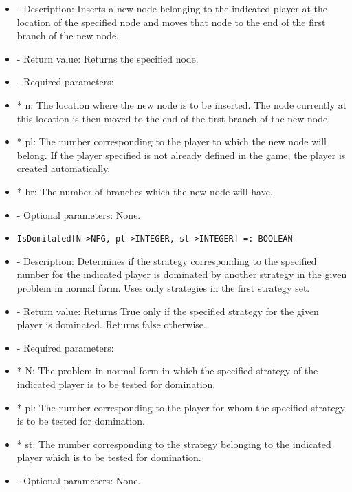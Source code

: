 \begin{itemize}
\bd
\item
- Description:  Inserts a new node belonging to the indicated player at 
the location of the specified node and moves that node to the end of 
the first branch of the new node.
\item
- Return value:  Returns the specified node.
\item
- Required parameters:

\bd
\item
*  n:  The location where the new node is to be inserted.  The node
currently at this location is then moved to the end of the first
branch of the new node.
\item
*  pl:  The number corresponding to the player to which the new node
will belong.  If the player specified is not already defined in	the
game, the player is created automatically.
\item
*  br:  The number of branches which the new node will have.
\ed

\item
- Optional parameters:  None.
\ed

\item
\begin{verbatim}
IsDomitated[N->NFG, pl->INTEGER, st->INTEGER] =: BOOLEAN
\end{verbatim}

\bd
\item
- Description:  Determines if the strategy corresponding to the specified
number for the indicated player is dominated by another strategy in the
given problem in normal form.  Uses only strategies in the first 
strategy set.
\item
- Return value:  Returns True only if the specified strategy for the 
given player is dominated.  Returns false otherwise.
\item
- Required parameters:

\bd
\item
*  N:  The problem in normal form in which the specified strategy of
the indicated player is to be tested for domination.
\item
*  pl:  The number corresponding to the player for whom the specified
strategy is to be tested for domination.
\item
*  st:  The number corresponding to the strategy belonging to the 
indicated player which is to be tested for domination.
\ed

\item
- Optional parameters:  None.
\ed


\end{itemize}
